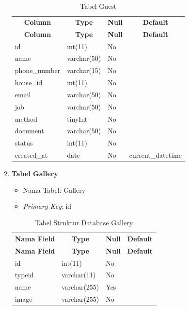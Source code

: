 \begin{enumerate}
   \begin{longtable}{|p{5cm}|p{3cm}|p{2cm}|p{3cm}|}
	    \captionsetup{position=above} %
	    \caption{Tabel Guest}
	    \label{tab:struktur-database} \\ \hline
	    \multicolumn{1}{|c|}{\textbf{Column}} & \multicolumn{1}{c|}{\textbf{Type}} & \multicolumn{1}{c|}{\textbf{Null}} & \multicolumn{1}{c|}{\textbf{Default}} \\ \hline
	    \endfirsthead
	    \hline
	    \multicolumn{1}{|c|}{\textbf{Column}} & \multicolumn{1}{c|}{\textbf{Type}} & \multicolumn{1}{c|}{\textbf{Null}} & \multicolumn{1}{c|}{\textbf{Default}} \\ \hline
	    \endhead
	    id & int(11) & No & \\ \hline
	    name & varchar(50) & No & \\ \hline
	    phone\_number &	varchar(15) & No & \\ \hline
	    house\_id & int(11) & No & \\ \hline
	    email & varchar(50) & No & \\ \hline
		job & varchar(50) & No & \\ \hline
		method & tinyInt & No & \\ \hline
		document & varchar(50) & No & \\ \hline
		status & int(11) & No & \\ \hline
		created\_at & date & No & current\_datetime \\ \hline
	\end{longtable}

    \item \textbf{Tabel Gallery}
    
    \begin{itemize}
        \item Nama Tabel: Gallery
        \item \textit{Primary Key}: id
    \end{itemize}

    \begin{longtable}{|p{5cm}|p{3cm}|p{2cm}|p{3cm}|}
	    \captionsetup{position=above} %
	    \caption{Tabel Struktur Database Gallery}
	    \label{tab:struktur-database} \\ \hline
	    \multicolumn{1}{|c|}{\textbf{Nama Field}} & \multicolumn{1}{c|}{\textbf{Type}} & \multicolumn{1}{c|}{\textbf{Null}} & \multicolumn{1}{c|}{\textbf{Default}} \\ \hline
	    \endfirsthead
	    \hline
	    \multicolumn{1}{|c|}{\textbf{Nama Field}} & \multicolumn{1}{c|}{\textbf{Type}} & \multicolumn{1}{c|}{\textbf{Null}} & \multicolumn{1}{c|}{\textbf{Default}} \\ \hline
	    \endhead
	    id & int(11) & No & \\ \hline
	    typeid & varchar(11) & No & \\ \hline
	    name & varchar(255) & Yes & \\ \hline
	    image & varchar(255) & No & \\ \hline
	\end{longtable}

\end{enumerate}
